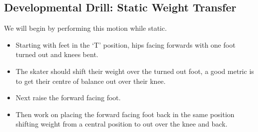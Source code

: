 \subsection*{Developmental Drill: Static Weight Transfer}
\label{drill:laterals/developmental/weight_transfer_static}

We will begin by performing this motion while static.

\begin{itemize}
\item Starting with feet in the `T' position, hips facing forwards with one foot turned out and knees bent.
\item The skater should shift their weight over the turned out foot, a good metric is to get their centre of balance out over their knee. 
\item Next raise the forward facing foot. 
\item Then work on placing the forward facing foot back in the same position shifting weight from a central position to out over the knee and back.
\end{itemize}


%
%
